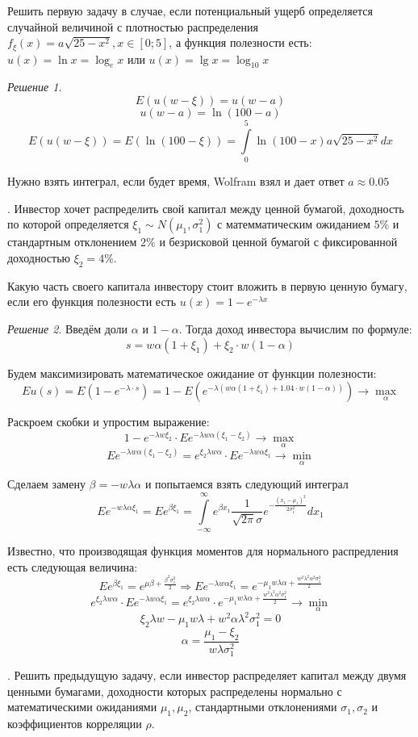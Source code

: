 \documentclass[%
12pt, %
final, %
oneside, %
onecolumn, %
centertags]{article} %
\theoremstyle{plain}
\theoremstyle{definition}
\theoremstyle{remark}
\newtheorem{solution}{Решение}
\begin{document}
 Решить первую задачу в случае, если потенциальный ущерб определяется случайной величиной с плотностью распределения $f_{\xi}(x) = a\sqrt{25-x^2}, x \in [0;5]$, а функция полезности есть:
$u(x) = \ln x = \log_e x $ или $u(x) = \lg x = \log_{10} x$

\begin{solution}
	$$E(u(w-\xi)) = u(w - a)$$
	$$u(w-a) = \ln(100 - a)$$
	$$E(u(w-\xi)) = E\left(\ln(100-\xi)\right) = \int\limits_{0}^5 \ln(100 - x) a\sqrt{25-x^2}dx$$

	Нужно взять интеграл, если будет время, Wolfram взял и дает ответ $a \approx 0.05$
\end{solution}
. Инвестор хочет распределить свой капитал между ценной бумагой, доходность по которой определяется $\xi_1 \sim N(\mu_1,\sigma_1^2)$ с матемматическим ожиданием $5\%$ и стандартным отклонением $2\%$ и безрисковой ценной бумагой с фиксированной доходностью $\xi_2 = 4\%$. 

Какую часть своего капитала инвестору стоит вложить в первую ценную бумагу, если его функция полезности есть $u(x) = 1 - e^{-\lambda x}$
\begin{solution}
	Введём доли $\alpha$ и $1-\alpha$. Тогда доход инвестора вычислим по формуле:
	$$ s = w\alpha(1+\xi_1) + \xi_2 \cdot w(1-\alpha)$$

	Будем максимизировать математическое ожидание от функции полезности:
	$$Eu(s) = E (1-e^{-\lambda \cdot s}) = 1 - E \left(e^{-\lambda \left(w\alpha(1+\xi_1) + 1.04 \cdot w(1-\alpha)\right)}\right) \to \underset{\alpha}{\max}$$

	Раскроем скобки и упростим выражение:
	$$1 - e^{-\lambda w \xi_2} \cdot Ee^{-\lambda w \alpha (\xi_1 - \xi_2)} \to \underset{\alpha}{\max}$$
	$$Ee^{-\lambda w \alpha (\xi_1 - \xi_2)} = e^{\xi_2 \lambda w \alpha } \cdot Ee^{-\lambda w \alpha\xi_1} \to \underset{\alpha}{\min} $$

	Сделаем замену $\beta = -w\lambda\alpha$ и попытаемся взять следующий интеграл
	$$Ee^{-w\lambda\alpha\xi_1} = Ee^{\beta \xi_1} = \int\limits_{-\infty}^{\infty} e^{\beta x_1}\frac{1}{\sqrt{2\pi}\sigma}e^{-\frac{(x_1-\mu_1)^2}{2\sigma_1^2}}dx_1$$

	Известно, что производящая функция моментов для нормального распредления есть следующая величина:
	$$Ee^{\beta \xi_1} = e^{\mu\beta + \frac{\beta^2 \sigma_1^2}{2}} \Rightarrow Ee^{-\lambda w \alpha \xi_1} = e^{-\mu_1w\lambda\alpha + \frac{w^2 \lambda^2\alpha^2 \sigma_1^2}{2}}$$
	$$e^{\xi_2 \lambda w \alpha } \cdot Ee^{-\lambda w \alpha\xi_1} = e^{\xi_2 \lambda w \alpha } \cdot e^{-\mu_1w\lambda\alpha + \frac{w^2 \lambda^2\alpha^2 \sigma_1^2}{2}} \to \underset{\alpha}{\min}$$
	$$\xi_2 \lambda w -\mu_1w\lambda + w^2 \alpha \lambda^2 \sigma_1^2 = 0$$
	$$\alpha = \frac{\mu_1 - \xi_2}{w\lambda\sigma_1^2} $$



\end{solution}
. Решить предыдущую задачу, если инвестор распределяет капитал между двумя ценными бумагами, доходности которых распределены нормально с математическими ожиданиями $\mu_1,\mu_2$, стандартными отклонениями $\sigma_1, \sigma_2$ и коэффициентов корреляции $\rho$.
\end{document}
